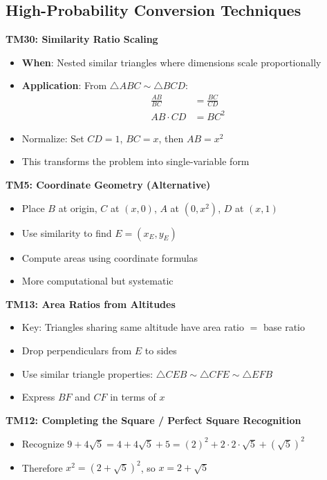 \documentclass[]{article}
\begin{document}
\begin{techniquesbox}
\subsection*{High-Probability Conversion Techniques}

\textbf{TM30: Similarity Ratio Scaling}
\begin{itemize}[leftmargin=*]
    \item \textbf{When}: Nested similar triangles where dimensions scale proportionally
    \item \textbf{Application}: From $\triangle ABC \sim \triangle BCD$:
    \begin{align*}
        \frac{AB}{BC} &= \frac{BC}{CD} \\
        AB \cdot CD &= BC^2
    \end{align*}
    \item Normalize: Set $CD = 1$, $BC = x$, then $AB = x^2$
    \item This transforms the problem into single-variable form
\end{itemize}

\textbf{TM5: Coordinate Geometry (Alternative)}
\begin{itemize}[leftmargin=*]
    \item Place $B$ at origin, $C$ at $(x, 0)$, $A$ at $(0, x^2)$, $D$ at $(x, 1)$
    \item Use similarity to find $E = (x_E, y_E)$
    \item Compute areas using coordinate formulas
    \item More computational but systematic
\end{itemize}

\textbf{TM13: Area Ratios from Altitudes}
\begin{itemize}[leftmargin=*]
    \item Key: Triangles sharing same altitude have area ratio $= $ base ratio
    \item Drop perpendiculars from $E$ to sides
    \item Use similar triangle properties: $\triangle CEB \sim \triangle CFE \sim \triangle EFB$
    \item Express $BF$ and $CF$ in terms of $x$
\end{itemize}

\textbf{TM12: Completing the Square / Perfect Square Recognition}
\begin{itemize}[leftmargin=*]
    \item Recognize $9 + 4\sqrt{5} = 4 + 4\sqrt{5} + 5 = (2)^2 + 2 \cdot 2 \cdot \sqrt{5} + (\sqrt{5})^2$
    \item Therefore $x^2 = (2 + \sqrt{5})^2$, so $x = 2 + \sqrt{5}$
\end{itemize}
\end{techniquesbox}
\end{document}
